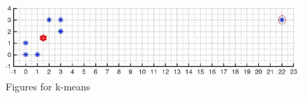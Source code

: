 \begin{enumerate}
\begin{figure}[H]
  \centering
  \includegraphics[scale=0.8]{images/4_2_2}
  \caption{Figures for k-means}\label{fig:kmeans}
\end{figure}


\end{enumerate}



  
